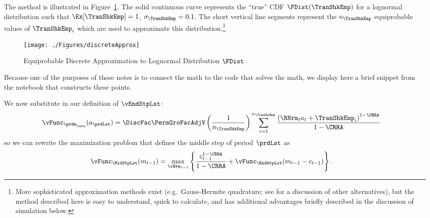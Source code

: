 The method is illustrated in Figure~\ref{fig:discreteapprox}.  The solid continuous curve represents
the ``true'' CDF $\FDist(\TranShkEmp)$ for a lognormal distribution such that $\Ex[\TranShkEmp] = 1$, $\sigma_{\TranShkEmp} = 0.1$.  The short vertical line segments represent the $n_{\TranShkEmp}$
equiprobable values of $\TranShkEmp_{i}$ which are used to approximate this
distribution.\footnote{More sophisticated approximation methods exist
  (e.g.\ Gauss-Hermite quadrature; see \cite{kopecky2010finite} for a discussion of other alternatives), but the method described here is easy to understand, quick to calculate, and has additional advantages briefly described in the discussion of simulation below.}
  \hypertarget{discreteApprox}{}
  \begin{figure}
    \texttt{[image: ./Figures/discreteApprox]}
    \caption{Equiprobable Discrete Approximation to Lognormal Distribution $\FDist$}
    \label{fig:discreteapprox}
  \end{figure}

Because one of the purposes of these notes is to connect the math to the code that solves the math, we display here a brief snippet from the notebook that constructs these points.


\lstset{basicstyle=\ttfamily\footnotesize,breaklines=true,language=Python,frame=single}


We now substitute in our definition of $\vEndStpLst$:
  \begin{equation}\begin{gathered}\begin{aligned}
        \vFunc_{{\prdm}_\cntn}({a}_{\prdLst})  & =   \DiscFac \PermGroFacAdjV\left(\frac{1}{n_{\TranShkEmp}}\right)\sum_{i=1}^{n_{\TranShkEmp}}   \frac{\left(\RNrm_{\prd} {a}_{\prd} + \TranShkEmp_{i}\right)^{1-\CRRA}}{1-\CRRA} \label{eq:vDiscrete}
      \end{aligned}\end{gathered}\end{equation}
so we can rewrite the maximization problem that defines the middle step of period {$\prdLst$} as %
  \begin{equation}\begin{gathered}\begin{aligned}
        {\vFunc}_{\MidStpLst}({m}_{\prdT-1})   & = \max_{\cNrm_{\prdT-1}}
        \left\{
          \frac{{c}_{\prdT-1}^{1-\CRRA}}{1-\CRRA} +
          \vFunc_{\EndStpLst}({m}_{\prdT-1}-{c}_{\prdT-1})
        \right\}.
        \label{eq:vEndTm1}
      \end{aligned}\end{gathered}\end{equation}%

